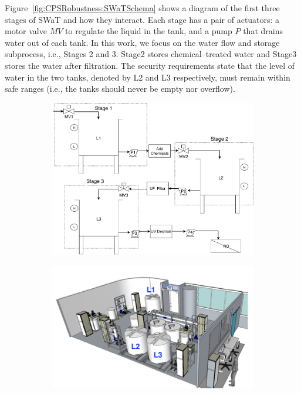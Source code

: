 {{Figure~\ref{fig:CPSRobustness:SWaTSchema} shows a diagram of the first three stages of SWaT and how they interact. 
Each stage has a pair of actuators: a motor valve $MV$ to regulate the liquid in the tank, and a pump $P$ that drains water out of each tank.
In this work, we focus on the water flow and storage subprocess, i.e., Stages 2 and 3. %
Stage2 stores chemical--treated water and Stage3 stores the water after filtration. The security requirements state that the level of water in the two tanks, denoted by L2 and L3 respectively, must remain within safe ranges (i.e., the tanks should never be empty nor overflow).
\begin{figure}[htb]
  \centering
  \begin{subfigure}[b]{.65\linewidth}
  \includegraphics[width=\linewidth]{Figures/SWaT_allTanks-Stages}
  \end{subfigure}
  \begin{subfigure}[b]{.35\linewidth}
  \includegraphics[width=\linewidth]{Figures/testbed.png}

\end{subfigure}
\end{figure}}}
